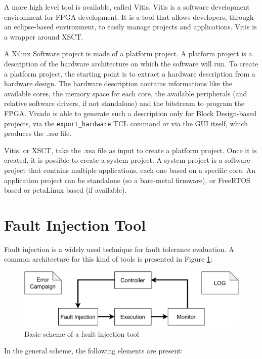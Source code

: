 A more high level tool is available, called Vitis. Vitis is a software development environment for FPGA development. It is a tool that allows developers, through an eclipse-based environment, to easily manage projects and applications. Vitis is a wrapper around XSCT. \bigskip

A Xilinx Software project is made of a platform project. A platform project is a description of the hardware architecture on which the software will run. To create a platform project, the starting point is to extract a hardware description from a hardware design. The hardware description contains informations like the available cores, the memory space for each core, the available peripherals (and relative software drivers, if not standalone) and the bitstream to program the FPGA. Vivado is able to generate such a description only for Block Design-based projects, via the \texttt{export\_hardware} TCL command or via the GUI itself, which produces the \textit{.xsa} file. \bigskip

Vitis, or XSCT, take the .xsa file as input to create a platform project. Once it is created, it is possible to create a system project. A system project is a software project that contains multiple applications, each one based on a specific core. An application project can be standalone (so a bare-metal firmware), or FreeRTOS based or petaLinux based (if available). 

\section{Fault Injection Tool}

Fault injection is a widely used technique for fault tolerance evaluation. A common architecture for this kind of tools is presented in Figure \ref{fig:fi_example}:

\begin{figure}[H]
\centering
\includegraphics[width=0.95\linewidth]{images/chapter3/fi_env.pdf}
\caption{Basic scheme of a fault injection tool \cite{Ruano2021-wy}}
\label{fig:fi_example}
\end{figure}

In the general scheme, the following elements are present:

